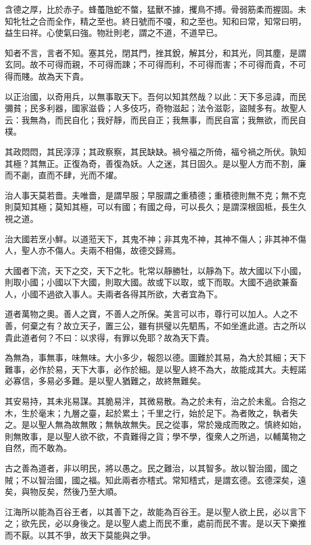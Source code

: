 \begin{pinyinscope}
含德之厚，比於赤子。蜂蠆虺蛇不螫，猛獸不據，攫鳥不搏。骨弱筋柔而握固。未知牝牡之合而全作，精之至也。終日號而不嗄，和之至也。知和曰常，知常曰明，益生曰祥。心使氣曰強。物壯則老，謂之不道，不道早已。

知者不言，言者不知。塞其兑，閉其門，挫其銳，解其分，和其光，同其塵，是謂玄同。故不可得而親，不可得而踈；不可得而利，不可得而害；不可得而貴，不可得而賤。故為天下貴。

以正治國，以奇用兵，以無事取天下。吾何以知其然哉？以此：天下多忌諱，而民彌貧；民多利器，國家滋昏；人多伎巧，奇物滋起；法令滋彰，盜賊多有。故聖人云：我無為，而民自化；我好靜，而民自正；我無事，而民自富；我無欲，而民自樸。

其政悶悶，其民淳淳；其政察察，其民缺缺。禍兮福之所倚，福兮禍之所伏。孰知其極？其無正。正復為奇，善復為妖。人之迷，其日固久。是以聖人方而不割，廉而不劌，直而不肆，光而不燿。

治人事天莫若嗇。夫唯嗇，是謂早服；早服謂之重積德；重積德則無不克；無不克則莫知其極；莫知其極，可以有國；有國之母，可以長久；是謂深根固柢，長生久視之道。

治大國若烹小鮮。以道蒞天下，其鬼不神；非其鬼不神，其神不傷人；非其神不傷人，聖人亦不傷人。夫兩不相傷，故德交歸焉。

大國者下流，天下之交，天下之牝。牝常以靜勝牡，以靜為下。故大國以下小國，則取小國；小國以下大國，則取大國。故或下以取，或下而取。大國不過欲兼畜人，小國不過欲入事人。夫兩者各得其所欲，大者宜為下。

道者萬物之奧。善人之寶，不善人之所保。美言可以市，尊行可以加人。人之不善，何棄之有？故立天子，置三公，雖有拱璧以先駟馬，不如坐進此道。古之所以貴此道者何？不曰：以求得，有罪以免耶？故為天下貴。

為無為，事無事，味無味。大小多少，報怨以德。圖難於其易，為大於其細；天下難事，必作於易，天下大事，必作於細。是以聖人終不為大，故能成其大。夫輕諾必寡信，多易必多難。是以聖人猶難之，故終無難矣。

其安易持，其未兆易謀。其脆易泮，其微易散。為之於未有，治之於未亂。合抱之木，生於毫末；九層之臺，起於累土；千里之行，始於足下。為者敗之，執者失之。是以聖人無為故無敗；無執故無失。民之從事，常於幾成而敗之。慎終如始，則無敗事，是以聖人欲不欲，不貴難得之貨；學不學，復衆人之所過，以輔萬物之自然，而不敢為。

古之善為道者，非以明民，將以愚之。民之難治，以其智多。故以智治國，國之賊；不以智治國，國之福。知此兩者亦𥡴式。常知𥡴式，是謂玄德。玄德深矣，遠矣，與物反矣，然後乃至大順。

江海所以能為百谷王者，以其善下之，故能為百谷王。是以聖人欲上民，必以言下之；欲先民，必以身後之。是以聖人處上而民不重，處前而民不害。是以天下樂推而不厭。以其不爭，故天下莫能與之爭。


\end{pinyinscope}
